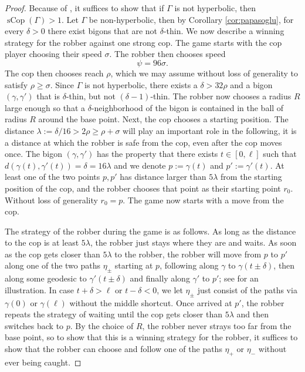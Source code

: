 \documentclass{amsart}
\theoremstyle{definition}
\theoremstyle{remark}
\theoremstyle{remark}
\theoremstyle{definition}
\newcommand{\sCop}{\operatorname{sCop}}
\renewcommand{\geq}{\geqslant}
\begin{document}
\begin{proof}
    Because of \cite[Theorem A]{LMR23}, it suffices to show that if $\Gamma$ is not hyperbolic, then $\sCop(\Gamma)>1$. Let $\Gamma$ be non-hyperbolic, then by Corollary \ref{cor:papasoglu}, for every $\delta >0 $ there exist bigons that are not $\delta$-thin. We now describe a winning strategy for the robber against one strong cop. The game starts with the cop player choosing their speed $\sigma$. The robber then chooses speed
    $$
    \psi = 96 \sigma.
    $$
		The cop then chooses reach $\rho$, which we may assume without loss of generality to satisfy $\rho \geq \sigma$. Since $\Gamma$ is not hyperbolic, there exists a $\delta > 32\rho$ and a bigon $(\gamma, \gamma')$ that is $\delta$-thin, but not $(\delta-1)$-thin. The robber now chooses a radius $R$ large enough so that a $\delta$-neighborhood of the bigon is contained in the ball of radius $R$ around the base point. Next, the cop chooses a starting position. The distance $\lambda := \delta/16 > 2 \rho \geq \rho + \sigma$ will play an important role in the following, it is a distance at which the robber is safe from the cop, even after the cop moves once. The bigon $(\gamma, \gamma')$ has the property that there exists $t \in [0,\ell]$ such that $d(\gamma(t),\gamma'(t)) = \delta = 16\lambda$ and we denote $p := \gamma(t)$ and $p':=\gamma'(t)$.
    At least one of the two points $p,p'$ has distance larger than $5 \lambda$ from the starting position of the cop, and the robber chooses that point as their starting point $r_0$. Without loss of generality $r_0 = p$. The game now starts with a move from the cop.

    The strategy of the robber during the game is as follows. As long as the distance to the cop is at least $5\lambda$, the robber just stays where they are and waits. As soon as the cop gets closer than $5\lambda$ to the robber, the robber will move from $p$ to $p'$ along one of the two paths $\eta_{\pm}$ starting at $p$, following along $\gamma$ to $\gamma(t \pm \delta)$, then along some geodesic to $\gamma'(t \pm \delta)$ and finally along $\gamma'$ to $p'$; see  for an illustration. In case $t+\delta > \ell$ or $t-\delta < 0$, we let $\eta_{\pm}$ just consist of the paths via $\gamma(0)$ or $\gamma(\ell)$ without the middle shortcut. Once arrived at $p'$, the robber repeats the strategy of waiting until the cop gets closer than $5\lambda$ and then switches back to $p$. By the choice of $R$, the robber never strays too far from the base point, so to show that this is a winning strategy for the robber, it suffices to show that the robber can choose and follow one of the paths $\eta_+$ or $\eta_-$ without ever being caught.


\end{proof}
\end{document}
